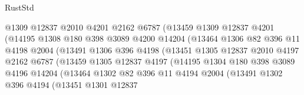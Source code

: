 \begin{lexlean}{RustStd}
\begin{coremodule}
{\begin{coremodule}
{{{{{{{{{{{{{{{{{{{{{{{{{{{{{{{                            @1309
                            @12837
                            @2010
                            @4201
                            @2162
                            @6787
                            (@13459
                              @1309
                              @12837
                              @4201
                              (@14195
                                @1308
                                @180
                                @398
                                @3089
                                @4200
                                @14204
                                (@13464
                                  @1306
                                  @82
                                  @396
                                  @11
                                  @4198
                                  @2004
                                  (@13491
                                    @1306
                                    @396
                                    @4198
                                    (@13451
                                      @1305
                                      @12837
                                      @2010
                                      @4197
                                      @2162
                                      @6787
                                      (@13459
                                        @1305
                                        @12837
                                        @4197
                                        (@14195
                                          @1304
                                          @180
                                          @398
                                          @3089
                                          @4196
                                          @14204
                                          (@13464
                                            @1302
                                            @82
                                            @396
                                            @11
                                            @4194
                                            @2004
                                            (@13491
                                              @1302
                                              @396
                                              @4194
                                              (@13451
                                                @1301
                                                @12837
}}}}}}}}}}}}}}}}}}}}}}}}}}}}}}}
\end{coremodule}}
\end{coremodule}
\end{lexlean}
